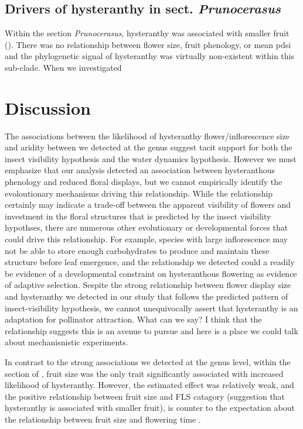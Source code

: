 \documentclass{article}\usepackage[]{graphicx}\usepackage[]{color}
\begin{document}
\subsection*{Drivers of hysteranthy in sect. \textit{Prunocerasus} }
Within the section \textit{Prunocerasus}, hysteranthy was associated with smaller fruit (). There was no relationship between flower size, fruit phenology, or mean pdsi and the phylogenetic signal of hysteranthy was virtually non-existent within this sub-clade. When we investigated

\section*{Discussion}
The associations between the likelihood of hysteranthy flower/inflorescence size and aridity between we detected at the genus suggest tacit support for both the insect visibility hypothesis and the water dynamics hypothesis. However we must emphasize that our analysis detected an association between hysteranthous phenology and reduced floral displays, but we cannot empirically identify the evoloutionary mechanisms driving this relationship. While the relationship certainly may indicate a trade-off between the apparent visibility of flowers and investment in the floral structures that is predicted by the insect visibility hypothses, there are numerous other evolutionary or developmental forces that could drive this relationship. For example, species with large inflorescence may not be able to store enough carbohydrates to produce and maintain these structure before leaf emergence, and the relationship we detected could a readily be evidence of a developmental constraint on hysteranthous flowering as evidence of adaptive selection.  Sespite the strong relationship between flower display size and hysteranthy we detected in our study that follows the predicted pattern of insect-visibility hypothesis, we cannot unequivocally assert that hysteranthy is an adaptation for pollinator attraction. What can we say? I think that the relationship suggests this is an avenue to pursue and here is a place we could talk about mechanisnistic experiments.

\noindent In contrast to the strong associations we detected at the genus level, within the section of , fruit size was the only trait significantly associated with increased likelihood of hysteranthy. However, the estimated effect was relatively weak, and the positive relationship between fruit size and FLS catagory (suggestion that hysteranthy is associated with smaller fruit), is counter to the expectation about the relationship between fruit size and flowering time \citep{}.
\end{document}
